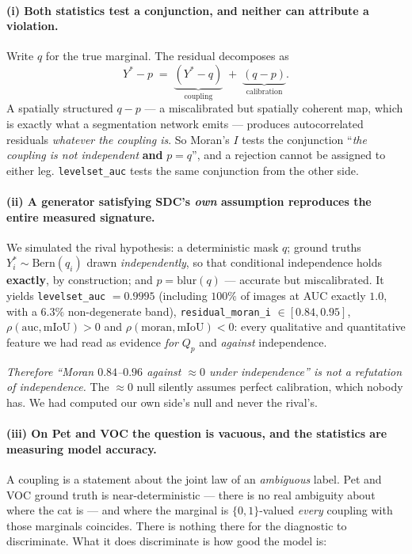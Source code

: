 \documentclass[11pt]{article}
\theoremstyle{remark}
\begin{document}
\paragraph{(i) Both statistics test a conjunction, and neither can attribute a
violation.} Write $q$ for the true marginal. The residual decomposes as
\begin{equation}\label{eq:residualdecomp}
Y^* - p \;=\; \underbrace{(Y^* - q)}_{\text{coupling}} \;+\; \underbrace{(q - p)}_{\text{calibration}} .
\end{equation}
A spatially structured $q-p$ --- a miscalibrated but spatially coherent map, which is
exactly what a segmentation network emits --- produces autocorrelated residuals
\emph{whatever the coupling is}. So Moran's $I$ tests the conjunction ``\emph{the
coupling is not independent} \textbf{and} $p=q$'', and a rejection cannot be assigned to
either leg. \texttt{levelset\_auc} tests the same conjunction from the other side.

\paragraph{(ii) A generator satisfying SDC's \emph{own} assumption reproduces the entire
measured signature.} We simulated the rival hypothesis: a deterministic mask $q$; ground
truths $Y^*_i \sim \mathrm{Bern}(q_i)$ drawn \emph{independently}, so that conditional
independence holds \textbf{exactly}, by construction; and $p = \mathrm{blur}(q)$ ---
accurate but miscalibrated. It yields \texttt{levelset\_auc} $=0.9995$ (including
$100\%$ of images at AUC exactly $1.0$, with a $6.3\%$ non-degenerate band),
\texttt{residual\_moran\_i} $\in[0.84, 0.95]$, $\rho(\text{auc},\text{mIoU})>0$ and
$\rho(\text{moran},\text{mIoU})<0$: every qualitative and quantitative feature we had
read as evidence \emph{for} $Q_p$ and \emph{against} independence.

\emph{Therefore ``Moran $0.84$--$0.96$ against $\approx 0$ under independence'' is not a
refutation of independence.} The $\approx 0$ null silently assumes perfect calibration,
which nobody has. We had computed our own side's null and never the rival's.

\paragraph{(iii) On Pet and VOC the question is vacuous, and the statistics are
measuring model accuracy.} A coupling is a statement about the joint law of an
\emph{ambiguous} label. Pet and VOC ground truth is near-deterministic --- there is no
real ambiguity about where the cat is --- and where the marginal is $\{0,1\}$-valued
\emph{every} coupling with those marginals coincides. There is nothing there for the
diagnostic to discriminate. What it does discriminate is how good the model is:
\end{document}
